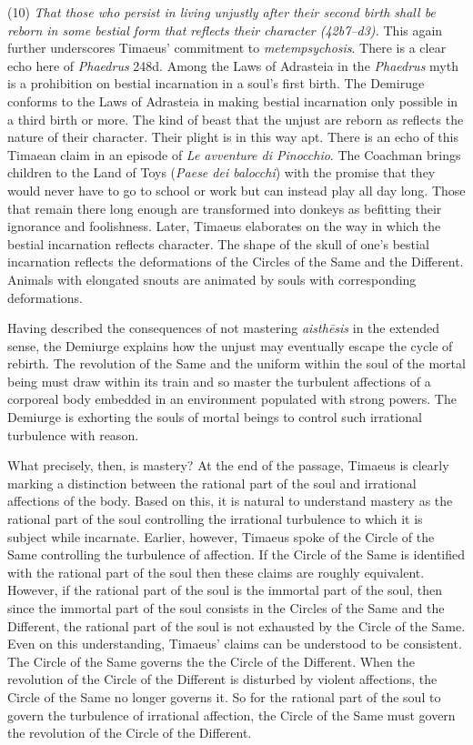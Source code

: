 (10) \emph{That those who persist in living unjustly after their second birth shall be reborn in some bestial form that reflects their character (42b7--d3).} This again further underscores Timaeus' commitment to \emph{metempsychosis}. There is a clear echo here of \emph{Phaedrus} 248d. Among the Laws of Adrasteia in the \emph{Phaedrus} myth is a prohibition on bestial incarnation in a soul's first birth. The Demiruge conforms to the Laws of Adrasteia in making bestial incarnation only possible in a third birth or more. The kind of beast that the unjust are reborn as reflects the nature of their character. Their plight is in this way apt. There is an echo of this Timaean claim in an episode of \emph{Le avventure di Pinocchio}. The Coachman brings children to the Land of Toys (\emph{Paese dei balocchi}) with the promise that they would never have to go to school or work but can instead play all day long. Those that remain there long enough are transformed into donkeys as befitting their ignorance and foolishness. Later, Timaeus elaborates on the way in which the bestial incarnation reflects character. The shape of the skull of one's bestial incarnation reflects the deformations of the Circles of the Same and the Different. Animals with elongated snouts are animated by souls with corresponding deformations. 

Having described the consequences of not mastering \emph{aisthēsis} in the extended sense, the Demiurge explains how the unjust may eventually escape the cycle of rebirth. The revolution of the Same and the uniform within the soul of the mortal being must draw within its train and so master the turbulent affections of a corporeal body embedded in an environment populated with strong powers. The Demiurge is exhorting the souls of mortal beings to control such irrational turbulence with reason. 

What precisely, then, is mastery? At the end of the passage, Timaeus is clearly marking a distinction between the rational part of the soul and irrational affections of the body. Based on this, it is natural to understand mastery as the rational part of the soul controlling the irrational turbulence to which it is subject while incarnate. Earlier, however, Timaeus spoke of the Circle of the Same controlling the turbulence of affection. If the Circle of the Same is identified with the rational part of the soul then these claims are roughly equivalent. However, if the rational part of the soul is the immortal part of the soul, then since the immortal part of the soul consists in the Circles of the Same and the Different, the rational part of the soul is not exhausted by the Circle of the Same. Even on this understanding, Timaeus' claims can be understood to be consistent. The Circle of the Same governs the the Circle of the Different. When the revolution of the Circle of the Different is disturbed by violent affections, the Circle of the Same no longer governs it. So for the rational part of the soul to govern the turbulence of irrational affection, the Circle of the Same must govern the revolution of the Circle of the Different.

